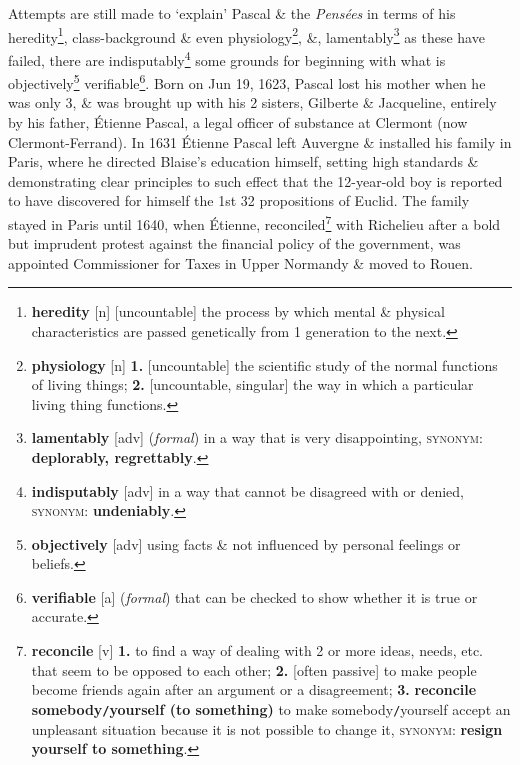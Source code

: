 \documentclass[oneside]{book}
\numberwithin{equation}{section}
\begin{document}
\noindent{} Attempts are still made to `explain' Pascal \& the \textit{Pens\'ees} in terms of his heredity\footnote{\textbf{heredity} [n] [uncountable] the process by which mental \& physical characteristics are passed genetically from 1 generation to the next.}, class-background \& even physiology\footnote{\textbf{physiology} [n] \textbf{1.} [uncountable] the scientific study of the normal functions of living things; \textbf{2.} [uncountable, singular] the way in which a particular living thing functions.}, \&, lamentably\footnote{\textbf{lamentably} [adv] (\textit{formal}) in a way that is very disappointing, \textsc{synonym}: \textbf{deplorably, regrettably}.} as these have failed, there are indisputably\footnote{\textbf{indisputably} [adv] in a way that cannot be disagreed with or denied, \textsc{synonym}: \textbf{undeniably}.} some grounds for beginning with what is objectively\footnote{\textbf{objectively} [adv] using facts \& not influenced by personal feelings or beliefs.} verifiable\footnote{\textbf{verifiable} [a] (\textit{formal}) that can be checked to show whether it is true or accurate.}. Born on Jun 19, 1623, Pascal lost his mother when he was only 3, \& was brought up with his 2 sisters, Gilberte \& Jacqueline, entirely by his father, \'Etienne Pascal, a legal officer of substance at Clermont (now Clermont-Ferrand). In 1631 \'Etienne Pascal left Auvergne \& installed his family in Paris, where he directed Blaise's education himself, setting high standards \& demonstrating clear principles to such effect that the 12-year-old boy is reported to have discovered for himself the 1st 32 propositions of Euclid. The family stayed in Paris until 1640, when \'Etienne, reconciled\footnote{\textbf{reconcile} [v] \textbf{1.} to find a way of dealing with 2 or more ideas, needs, etc. that seem to be opposed to each other; \textbf{2.} [often passive] to make people become friends again after an argument or a disagreement; \textbf{3.} \textbf{reconcile somebody\texttt{/}yourself (to something)} to make somebody\texttt{/}yourself accept an unpleasant situation because it is not possible to change it, \textsc{synonym}: \textbf{resign yourself to something}.} with Richelieu after a bold but imprudent protest against the financial policy of the government, was appointed Commissioner for Taxes in Upper Normandy \& moved to Rouen.
\end{document}
